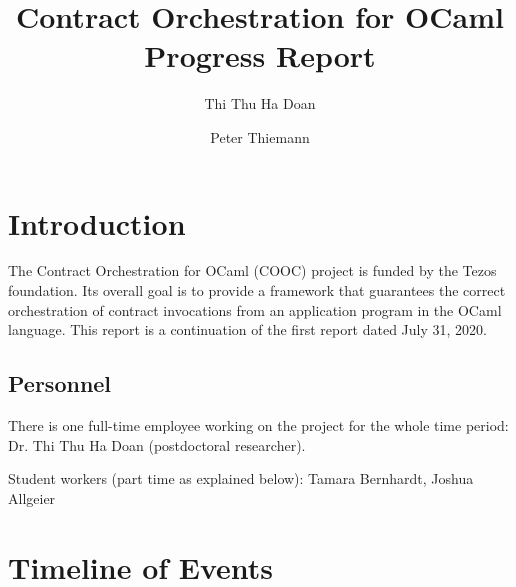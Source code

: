 \documentclass[a4paper,11pt]{article}
\title{Contract Orchestration for OCaml \\
  Progress Report 
}
\author{Thi Thu Ha Doan}
\author{Peter Thiemann}
\affil{University of Freiburg, Germany}
\begin{document}
\maketitle{}

\section{Introduction}
\label{sec:introduction}

The Contract Orchestration for OCaml (COOC) project is funded by the Tezos foundation. Its overall goal  is to provide a framework that guarantees the correct orchestration of contract invocations from an application program in the OCaml language. This report is a continuation of the first report dated July 31, 2020.

\subsection{Personnel}
\label{sec:personnel}

There is one full-time employee working on the project for the whole time period: Dr. Thi Thu Ha Doan (postdoctoral researcher). 

Student workers (part time as explained below): Tamara Bernhardt, Joshua Allgeier

\section{Timeline of Events}
\label{sec:timeline-events}
\end{document}
